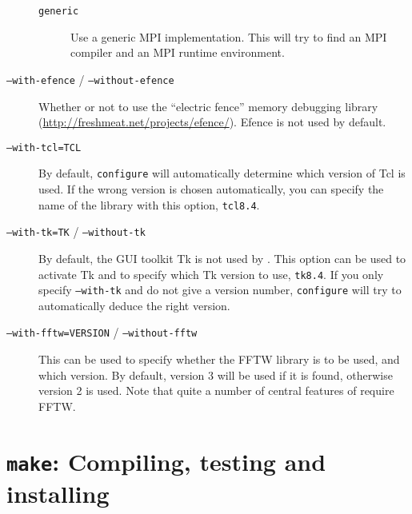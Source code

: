 \begin{description}
\begin{description}
  \item[\texttt{generic}] Use a generic MPI implementation. This will
    try to find an MPI compiler and an MPI runtime environment.
  \end{description}
\item[\texttt{--with-efence} / \texttt{--without-efence}] Whether or
  not to use the ``electric fence'' memory debugging library
  (\url{http://freshmeat.net/projects/efence/}). Efence is not used by
  default.
\item[\texttt{--with-tcl=TCL}] By default, \texttt{configure} will
  automatically determine which version of Tcl is used.  If the wrong
  version is chosen automatically, you can specify the name of the
  library with this option, \eg{} \texttt{tcl8.4}.
\item[\texttt{--with-tk=TK} / \texttt{--without-tk}] By default, the
  GUI toolkit Tk is not used by \es. This option can be used to
  activate Tk and to specify which Tk version to use, \eg{}
  \texttt{tk8.4}. If you only specify \texttt{--with-tk} and do not
  give a version number, \texttt{configure} will try to automatically
  deduce the right version.
\item[\texttt{--with-fftw=VERSION} / \texttt{--without-fftw}] This can
  be used to specify whether the FFTW library is to be used, and which
  version.  By default, version 3 will be used if it is found,
  otherwise version 2 is used.  Note that quite a number of central
  features of \es require FFTW.
\end{description}

\section{\texttt{make}: Compiling,  testing and installing \es}
\label{sec:make}

